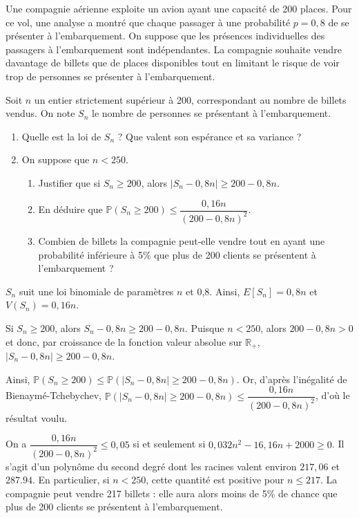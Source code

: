 \documentclass[11pt,fleqn, openany]{book} %
\begin{document}
\begin{exercise}[topic=lgn03]Une compagnie aérienne exploite un avion ayant une capacité de 200 places. Pour ce vol, une analyse a montré que chaque passager à une probabilité $p=0,8$ de se présenter à l'embarquement. On suppose que les présences individuelles des passagers à l'embarquement sont indépendantes. La compagnie souhaite vendre davantage de billets que de places disponibles tout en limitant le risque de voir trop de personnes se présenter à l'embarquement.

Soit $n$ un entier strictement supérieur à 200, correspondant au nombre de billets vendus. On note $S_n$ le nombre de personnes se présentant à l'embarquement.
\begin{enumerate}
\item Quelle est la loi de $S_n$ ? Que valent son espérance et sa variance ?
\item On suppose que $n<250$. 
\begin{enumerate}
\item Justifier que si $S_n \geqslant 200$, alors $|S_n-0,8n| \geqslant 200-0,8n$.
\item En déduire que $\mathbb{P}(S_n \geqslant 200) \leqslant \dfrac{0,16n}{(200-0,8n)^2}$.
\item Combien de billets la compagnie peut-elle vendre tout en ayant une probabilité inférieure à 5\% que plus de 200 clients se présentent à l'embarquement ?
\end{enumerate}
\end{enumerate}
\newpage \end{exercise}

\begin{solution}$S_n$ suit une loi binomiale de paramètres $n$ et 0,8. Ainsi, $E[S_n]=0,8n$ et $V(S_n)=0,16n$.

Si $S_n \geqslant 200$, alors $S_n - 0,8n \geqslant 200-0,8n$. Puisque $n<250$, alors $200-0,8n >0$ et donc, par croissance de la fonction valeur absolue sur $\mathbb{R}_+$, $|S_n-0,8n| \geqslant 200-0,8n$.

Ainsi, $\mathbb{P}(S_n \geqslant 200) \leqslant \mathbb{P}(|S_n-0,8n| \geqslant 200-0,8n)$. Or, d'après l'inégalité de Bienaymé-Tchebychev, $\mathbb{P}(|S_n-0,8n| \geqslant 200-0,8n) \leqslant \dfrac{0,16n}{(200-0,8n)^2}$, d'où le résultat voulu.

On a $\dfrac{0,16n}{(200-0,8n)^2} \leqslant 0,05$ si et seulement si $0,032n^2-16,16n+2000 \geqslant 0$. Il s'agit d'un polynôme du second degré dont les racines valent environ $217,06$ et $287.94$. En particulier, si $n <250$, cette quantité est positive pour $n \leqslant 217$. La compagnie peut vendre 217 billets : elle aura alors moins de 5\% de chance que plus de 200 clients se présentent à l'embarquement.\end{solution}
\end{document}
